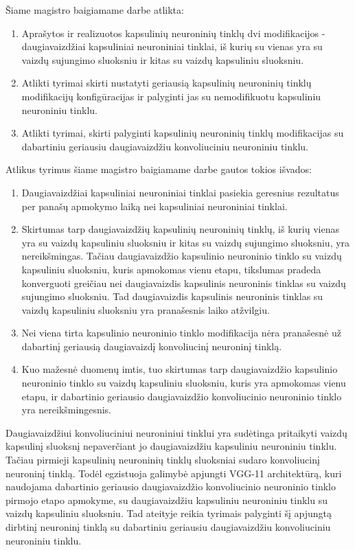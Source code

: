 
Šiame magistro baigiamame darbe atlikta:

\begin{enumerate}
	\item Aprašytos ir realizuotos kapsulinių neuroninių tinklų dvi modifikacijos - daugiavaizdžiai kapsuliniai neuroniniai tinklai, iš kurių su vienas yra su vaizdų sujungimo sluoksniu ir kitas su vaizdų kapsuliniu sluoksniu.
	\item Atlikti tyrimai skirti nustatyti geriausią kapsulinių neuroninių tinklų modifikacijų konfigūracijas ir palyginti jas su nemodifikuotu kapsuliniu neuroniniu tinklu.
	\item Atlikti tyrimai, skirti palyginti kapsulinių neuroninių tinklų modifikacijas su dabartiniu geriausiu daugiavaizdžiu konvoliuciniu neuroniniu tinklu.
\end{enumerate}

Atlikus tyrimus šiame magistro baigiamame darbe gautos tokios išvados:

\begin{enumerate}
	\item Daugiavaizdžiai kapsuliniai neuroniniai tinklai pasiekia geresnius rezultatus per panašų apmokymo laiką nei kapsuliniai neuroniniai tinklai.
	\item Skirtumas tarp daugiavaizdžių kapsulinių neuroninių tinklų, iš kurių vienas yra su vaizdų kapsuliniu sluoksniu ir kitas su vaizdų sujungimo sluoksniu, yra nereikšmingas. Tačiau daugiavaizdžio kapsulinio neuroninio tinklo su vaizdų kapsuliniu sluoksniu, kuris apmokomas vienu etapu, tikslumas pradeda konverguoti greičiau nei daugiavaizdis kapsulinis neuroninis tinklas su vaizdų sujungimo sluoksniu. Tad daugiavaizdis kapsulinis neuroninis tinklas su vaizdų kapsuliniu sluoksniu yra pranašesnis laiko atžvilgiu.
	\item Nei viena tirta kapsulinio neuroninio tinklo modifikacija nėra pranašesnė už dabartinį geriausią daugiavaizdį konvoliucinį neuroninį tinklą.
	\item Kuo mažesnė duomenų imtis, tuo skirtumas tarp daugiavaizdžio kapsulinio neuroninio tinklo su vaizdų kapsuliniu sluoksniu, kuris yra apmokomas vienu etapu, ir dabartinio geriausio daugiavaizdžio konvoliucinio neuroninio tinklo yra nereikšmingesnis.
\end{enumerate}

Daugiavaizdžiui konvoliuciniui neuroniniui tinklui yra sudėtinga pritaikyti vaizdų kapsulinį sluoksnį nepaverčiant jo daugiavaizdžiu kapsuliniu neuroniniu tinklu. Tačiau pirmieji kapsulinių neuroninių tinklų sluoksniai sudaro konvoliucinį neuroninį tinklą. Todėl egzistuoja galimybė apjungti VGG-11 architektūrą, kuri naudojama dabartinio geriausio daugiavaizdžio konvoliucinio neuroninio tinklo pirmojo etapo apmokyme, su daugiavaizdžiu kapsuliniu neuroniniu tinklu su vaizdų kapsuliniu sluoksniu. Tad ateityje reikia tyrimais palyginti šį apjungtą dirbtinį neuroninį tinklą su dabartiniu geriausiu daugiavaizdžiu konvoliuciniu neuroniniu tinklu.
